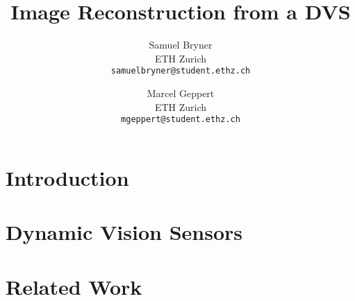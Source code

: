 \documentclass[10pt,twocolumn,letterpaper]{article}
\begin{document}

\title{Image Reconstruction from a DVS}

\author{Samuel Bryner\\
ETH Zurich\\
{\tt\small samuelbryner@student.ethz.ch}
\and
Marcel Geppert\\
ETH Zurich\\
{\tt\small mgeppert@student.ethz.ch}
}

\maketitle


\begin{abstract}



\end{abstract}

\section{Introduction}
\label{sec:introduction}


\section{Dynamic Vision Sensors}
\label{sec:dvs}


\section{Related Work}
\label{sec:related_work}

\end{document}
